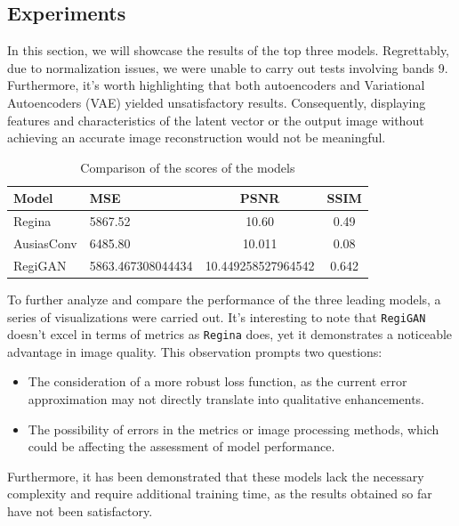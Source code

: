 \subsection{Experiments}
In this section, we will showcase the results of the top three models. Regrettably, due to normalization issues, we were unable to carry out tests involving bands 9. Furthermore, it's worth highlighting that both autoencoders and Variational Autoencoders (VAE) yielded unsatisfactory results. Consequently, displaying features and characteristics of the latent vector or the output image without achieving an accurate image reconstruction would not be meaningful.
\begin{table}[H]
	\caption{Comparison of the scores of the models}
	\centering
	\begin{tabular}{llcc}
		Model               & MSE              &      PSNR       &      SSIM      \\ \hline
		Regina           & 5867.52           &            10.60            & 0.49 \\
		AusiasConv & 6485.80 & 10.011 & 0.08\\
			RegiGAN             & 5863.467308044434       &     10.449258527964542      &     0.642      \\
	\end{tabular}
	\label{tab:models-l1}
\end{table}
To further analyze and compare the performance of the three leading models, a series of visualizations were carried out. It's interesting to note that \texttt{RegiGAN} doesn't excel in terms of metrics as \texttt{Regina} does, yet it demonstrates a noticeable advantage in image quality. This observation prompts two questions:
\begin{itemize}
	\item The consideration of a more robust loss function, as the current error approximation may not directly translate into qualitative enhancements.
	\item The possibility of errors in the metrics or image processing methods, which could be affecting the assessment of model performance.
\end{itemize}
Furthermore, it has been demonstrated that these models lack the necessary complexity and require additional training time, as the results obtained so far have not been satisfactory.
